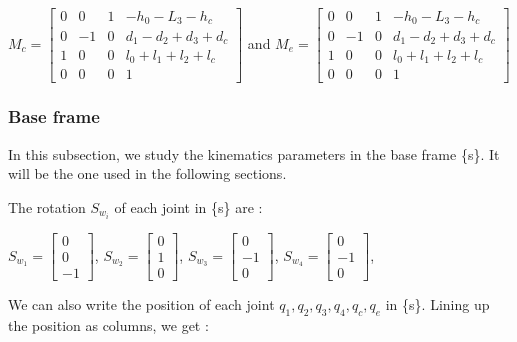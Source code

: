 \bigbreak
\begin{center}
    $
    M_c = \begin{bmatrix}
        0 & 0 & 1 & -h_0-L_3-h_c\\
        0 & -1 & 0 & d_1-d_2+d_3+d_c\\
        1 & 0 & 0 & l_0+l_1+l_2+l_c\\
        0 & 0 & 0 & 1
    \end{bmatrix}
    $
    and
    $
    M_e = \begin{bmatrix}
        0 & 0 & 1 & -h_0-L_3-h_c\\
        0 & -1 & 0 & d_1-d_2+d_3+d_c\\
        1 & 0 & 0 & l_0+l_1+l_2+l_c\\
        0 & 0 & 0 & 1
    \end{bmatrix}
    $
\end{center}

\subsubsection{Base frame}

In this subsection, we study the kinematics parameters in the base frame \{s\}. It will be the one used in the following sections.

\bigbreak
The rotation $S_{w_i}$ of each joint  in \{s\} are : 
\begin{center}
    $S_{w_1} = \begin{bmatrix} 0 \\ 0 \\ -1\end{bmatrix}$,
    $S_{w_2} = \begin{bmatrix} 0 \\ 1 \\ 0\end{bmatrix}$,
    $S_{w_3} = \begin{bmatrix} 0 \\ -1 \\ 0\end{bmatrix}$,
    $S_{w_4} = \begin{bmatrix} 0 \\ -1 \\ 0\end{bmatrix}$,
\end{center}

\bigbreak
We can also write the position of each joint  $q_1,q_2,q_3,q_4,q_c,q_e$ in \{s\}. Lining up the position as columns, we get : 

